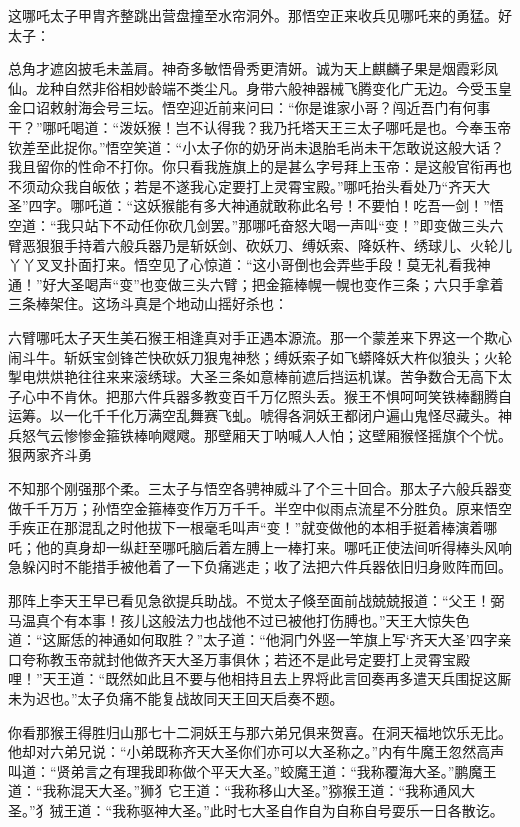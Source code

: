 \documentclass[12pt,UTF8]{ctexbook}
\begin{document}
这哪吒太子甲胄齐整跳出营盘撞至水帘洞外。那悟空正来收兵见哪吒来的勇猛。好太子：

总角才遮囟披毛未盖肩。神奇多敏悟骨秀更清妍。诚为天上麒麟子果是烟霞彩凤仙。龙种自然非俗相妙龄端不类尘凡。身带六般神器械飞腾变化广无边。今受玉皇金口诏敕射海会号三坛。悟空迎近前来问曰：“你是谁家小哥？闯近吾门有何事干？”哪吒喝道：“泼妖猴！岂不认得我？我乃托塔天王三太子哪吒是也。今奉玉帝钦差至此捉你。”悟空笑道：“小太子你的奶牙尚未退胎毛尚未干怎敢说这般大话？我且留你的性命不打你。你只看我旌旗上的是甚么字号拜上玉帝：是这般官衔再也不须动众我自皈依；若是不遂我心定要打上灵霄宝殿。”哪吒抬头看处乃“齐天大圣”四字。哪吒道：“这妖猴能有多大神通就敢称此名号！不要怕！吃吾一剑！”悟空道：“我只站下不动任你砍几剑罢。”那哪吒奋怒大喝一声叫“变！”即变做三头六臂恶狠狠手持着六般兵器乃是斩妖剑、砍妖刀、缚妖索、降妖杵、绣球儿、火轮儿丫丫叉叉扑面打来。悟空见了心惊道：“这小哥倒也会弄些手段！莫无礼看我神通！”好大圣喝声“变”也变做三头六臂；把金箍棒幌一幌也变作三条；六只手拿着三条棒架住。这场斗真是个地动山摇好杀也：

六臂哪吒太子天生美石猴王相逢真对手正遇本源流。那一个蒙差来下界这一个欺心闹斗牛。斩妖宝剑锋芒快砍妖刀狠鬼神愁；缚妖索子如飞蟒降妖大杵似狼头；火轮掣电烘烘艳往往来来滚绣球。大圣三条如意棒前遮后挡运机谋。苦争数合无高下太子心中不肯休。把那六件兵器多教变百千万亿照头丢。猴王不惧呵呵笑铁棒翻腾自运筹。以一化千千化万满空乱舞赛飞虬。唬得各洞妖王都闭户遍山鬼怪尽藏头。神兵怒气云惨惨金箍铁棒响飕飕。那壁厢天丁呐喊人人怕；这壁厢猴怪摇旗个个忧。狠两家齐斗勇

不知那个刚强那个柔。三太子与悟空各骋神威斗了个三十回合。那太子六般兵器变做千千万万；孙悟空金箍棒变作万万千千。半空中似雨点流星不分胜负。原来悟空手疾正在那混乱之时他拔下一根毫毛叫声“变！”就变做他的本相手挺着棒演着哪吒；他的真身却一纵赶至哪吒脑后着左膊上一棒打来。哪吒正使法间听得棒头风响急躲闪时不能措手被他着了一下负痛逃走；收了法把六件兵器依旧归身败阵而回。

那阵上李天王早已看见急欲提兵助战。不觉太子倏至面前战兢兢报道：“父王！弼马温真个有本事！孩儿这般法力也战他不过已被他打伤膊也。”天王大惊失色道：“这厮恁的神通如何取胜？”太子道：“他洞门外竖一竿旗上写‘齐天大圣’四字亲口夸称教玉帝就封他做齐天大圣万事俱休；若还不是此号定要打上灵霄宝殿哩！”天王道：“既然如此且不要与他相持且去上界将此言回奏再多遣天兵围捉这厮未为迟也。”太子负痛不能复战故同天王回天启奏不题。

你看那猴王得胜归山那七十二洞妖王与那六弟兄俱来贺喜。在洞天福地饮乐无比。他却对六弟兄说：“小弟既称齐天大圣你们亦可以大圣称之。”内有牛魔王忽然高声叫道：“贤弟言之有理我即称做个平天大圣。”蛟魔王道：“我称覆海大圣。”鹏魔王道：“我称混天大圣。”狮犭它王道：“我称移山大圣。”猕猴王道：“我称通风大圣。”犭狨王道：“我称驱神大圣。”此时七大圣自作自为自称自号耍乐一日各散讫。
\end{document}

